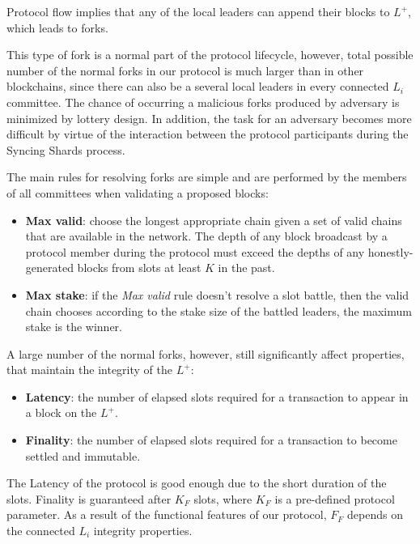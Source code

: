 Protocol flow implies that any of the local leaders can append their blocks to $L^+$, which leads to forks.

This type of fork is a normal part of the protocol lifecycle, however, total possible number of the normal forks in our protocol is much larger than in other blockchains, since there can also be a several local leaders in every connected $L_i$ committee.
The chance of occurring a malicious forks produced by adversary is minimized by lottery design.
In addition, the task for an adversary becomes more difficult by virtue of the interaction between the protocol participants during the Syncing Shards process.

The main rules for resolving forks are simple and are performed by the members of all committees when validating a proposed blocks:
\begin{itemize}
    \item \textbf{Max valid}: choose the longest appropriate chain given a set of valid chains that are available in the network.
    The depth of any block broadcast by a protocol member during the protocol must exceed the depths of any honestly-generated blocks from slots at least $K$ in the past.
    \item \textbf{Max stake}: if the \emph{Max valid} rule doesn't resolve a slot battle, then the valid chain chooses according to the stake size of the battled leaders, the maximum stake is the winner.
\end{itemize}

A large number of the normal forks, however, still significantly affect properties, that maintain the integrity of the $L^+$:
\begin{itemize}
    \item \textbf{Latency}: the number of elapsed slots required for a transaction to appear in a block on the $L^+$.
    \item \textbf{Finality}: the number of elapsed slots required for a transaction to become settled and immutable.
\end{itemize}
The Latency of the protocol is good enough due to the short duration of the slots.
Finality is guaranteed after $K_F$ slots, where $K_F$ is a pre-defined protocol parameter.
As a result of the functional features of our protocol, $F_F$ depends on the connected $L_i$ integrity properties.

